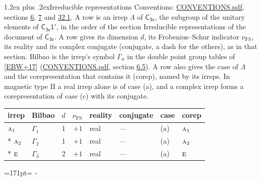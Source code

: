 \documentclass[10pt,a4paper]{article}
\makeatletter
\renewcommand\section{\@startsection{section}{1}{\z@}{-3ex plus -1ex minus -.2ex}%
  {1.2ex plus .2ex}{\normalfont\large\sffamily\bfseries\color{parttitle}}}
\newcommand{\needspace}[1]{\par\penalty-100\begingroup\dimen0=#1\relax\dimen2=\pagegoal
  \advance\dimen2-\pagetotal\ifdim\dimen0>\dimen2\relax\ifdim\dimen2>0pt\vfil\break\fi\fi
  \endgroup}
\numberwithin{equation}{section}
\newcommand{\grp}[1]{\mathsf{#1}}
\newcommand{\irr}[1]{\text{\normalfont\scshape #1}}
\newcommand{\fsind}{\nu_{\mathrm{FS}}}
\makeatother
\begin{document}
\section{Irreducible representations}\label{s:irreps}
Conventions: \href{../../CONVENTIONS.pdf}{CONVENTIONS.pdf}, sections \href{../../../rotation/CONVENTIONS.pdf\#conv.6}{6}, \href{../../../rotation/CONVENTIONS.pdf\#conv.7}{7} and \href{../../CONVENTIONS.pdf\#conv.32.1}{32.1}.
\leavevmode\label{n:irrep.Delta}A row is an irrep $\Lambda$ of $\grp{C_{3v}}$, the subgroup of the unitary elements of $\grp{C_{3v}1'}$, in the order of the section Irreducible representations of the document of \href{../../../rotation/data/pdf/C3v.pdf}{$\grp{C_{3v}}$}. \label{n:index.dimension}\label{n:index.frobenius}\label{n:head.irrep}\label{n:head.reality}\label{n:head.conjugate}A row gives its dimension $d$, its Frobenius--Schur indicator $\fsind$, its reality and its complex conjugate (conjugate, a dash for the others), as in that section. \label{n:head.bilbao}\label{n:irrep.alias.gamma}Bilbao is the irrep's symbol $\Gamma_n$ in the double point group tables of [\href{../../../REFERENCES.pdf\#ref.EBW+17}{EBW+17}] (\href{../../CONVENTIONS.pdf}{CONVENTIONS.pdf}, section \href{../../../rotation/CONVENTIONS.pdf\#conv.6.5}{6.5}). \label{n:head.case.corep}\label{n:head.corep}A row also gives the case of $\Lambda$ and the corepresentation that contains it (corep), named by its irreps. In magnetic type II a real irrep alone is of case (a), and a complex irrep forms a corepresentation of case (c) with its conjugate.
\setlength{\emergencystretch}{2em}\par\setlength{\emergencystretch}{0pt}
{\small\renewcommand{\arraystretch}{1.25}\setlength{\tabcolsep}{4pt}\begin{longtable}{@{}llrrllll@{}}\toprule
irrep & Bilbao & $d$ & $\fsind$ & reality & conjugate & case & corep\\\midrule\endhead
\bottomrule\endfoot\endlastfoot
$\irr{a}_{1}$ & $\Gamma_{1}$ & 1 & $+1$ & real & --- & (a) & $\irr{a}_{1}$\\*
$\irr{a}_{2}$ & $\Gamma_{2}$ & 1 & $+1$ & real & --- & (a) & $\irr{a}_{2}$\\*
$\irr{e}$ & $\Gamma_{3}$ & 2 & $+1$ & real & --- & (a) & $\irr{e}$\\
\bottomrule\end{longtable}}
\needspace{171pt}
\end{document}
